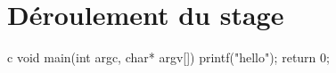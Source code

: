 \part{Déroulement du stage}




\begin{pygmented}{c}
void main(int argc, char* argv[])
{
	printf("hello");
	return 0;
}
\end{pygmented}

\cite{test}
